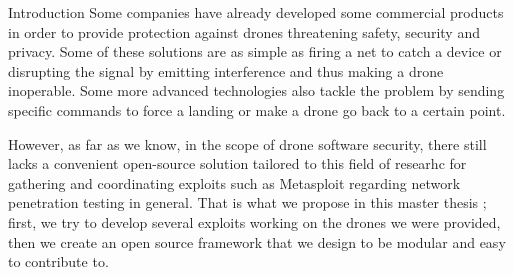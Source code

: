 \begin{chaptercover}{Introduction}
Some companies have already developed some commercial products in order to provide protection against drones threatening safety, security and privacy. Some of these solutions are as simple as firing a net to catch a device or disrupting the signal by emitting interference and thus making a drone inoperable. Some more advanced technologies also tackle the problem by sending specific commands to force a landing or make a drone go back to a certain point.

However, as far as we know, in the scope of drone software security, there still lacks a convenient open-source solution tailored to this field of researhc for gathering and coordinating exploits such as Metasploit regarding network penetration testing in general. That is what we propose in this master thesis ; first, we try to develop several exploits working on the drones we were provided, then we create an open source framework that we design to be modular and easy to contribute to.



\end{chaptercover}
